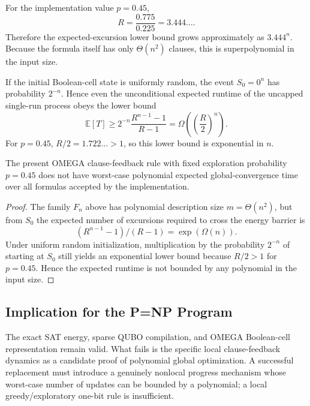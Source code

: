 For the implementation value $p=0.45$,
\begin{equation}
R
=
\frac{0.775}{0.225}
=
3.444\ldots.
\end{equation}
Therefore the expected-excursion lower bound grows approximately as
$3.444^n$.  Because the formula itself has only $\Theta(n^2)$ clauses, this is
superpolynomial in the input size.

If the initial Boolean-cell state is uniformly random, the event $S_0=0^n$
has probability $2^{-n}$.  Hence even the unconditional expected runtime of
the uncapped single-run process obeys the lower bound
\begin{equation}
\mathbb{E}[T]
\ge
2^{-n}
\frac{R^{n-1}-1}{R-1}
=
\Omega\!\left(
\left(\frac{R}{2}\right)^n
\right).
\end{equation}
For $p=0.45$, $R/2=1.722\ldots>1$, so this lower bound is exponential in $n$.

\begin{theorem}
The present OMEGA clause-feedback rule with fixed exploration probability
$p=0.45$ does not have worst-case polynomial expected global-convergence time
over all formulas accepted by the implementation.
\end{theorem}

\begin{proof}
The family $F_n$ above has polynomial description size
$m=\Theta(n^2)$, but from $S_0$ the expected number of excursions required to
cross the energy barrier is
\[
(R^{n-1}-1)/(R-1)=\exp(\Omega(n)).
\]
Under uniform random initialization, multiplication by the probability
$2^{-n}$ of starting at $S_0$ still yields an exponential lower bound because
$R/2>1$ for $p=0.45$.  Hence the expected runtime is not bounded by any
polynomial in the input size.
\end{proof}

\subsection{Implication for the P=NP Program}

The exact SAT energy, sparse QUBO compilation, and OMEGA Boolean-cell
representation remain valid.  What fails is the specific local
clause-feedback dynamics as a candidate proof of polynomial global
optimization.  A successful replacement must introduce a genuinely nonlocal
progress mechanism whose worst-case number of updates can be bounded by a
polynomial; a local greedy/exploratory one-bit rule is insufficient.
